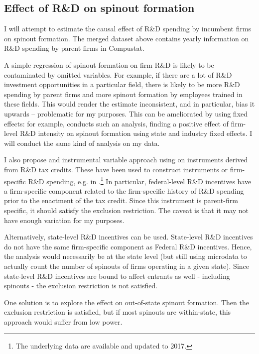 \documentclass[11pt,english]{article}
\theoremstyle{remark}
\begin{document}
\subsection{Effect of R\&D on spinout formation}

I will attempt to estimate the causal effect of R\&D spending by incumbent firms on spinout formation. The merged dataset above contains yearly information on R\&D spending by parent firms in Compustat. 

A simple regression of spinout formation on firm R\&D is likely to be contaminated by omitted variables. For example, if there are a lot of R\&D investment opportunities in a particular field, there is likely to be more R\&D spending by parent firms and more spinout formation by employees trained in these fields. This would render the estimate inconsistent, and in particular, bias it upwards -- problematic for my purposes. This can be ameliorated by using fixed effects: for example, \cite{baslandze_spinout_2019} conducts such an analysis, finding a positive effect of firm-level R\&D intensity on spinout formation using state and industry fixed effects. I will conduct the same kind of analysis on my data.

I also propose and instrumental variable approach using on instruments derived from R\&D tax credits. These have been used to construct instruments or firm-specific R\&D spending, e.g. in \cite{bloom_identifying_2013}.\footnote{The underlying data are available and updated to 2017.}  
In particular, federal-level R\&D incentives have a firm-specific component related to the firm-specific history of R\&D spending prior to the enactment of the tax credit. Since this instrument is parent-firm specific, it should satisfy the exclusion restriction. The caveat is that it may not have enough variation for my purposes.

Alternatively, state-level R\&D incentives can be used. State-level R\&D incentives do not have the same firm-specific component as Federal R\&D incentives. Hence, the analysis would necessarily be at the state level (but still using microdata to actually count the number of spinouts of firms operating in a given state). Since state-level R\&D incentives are bound to affect entrants as well - including spinouts - the exclusion restriction is not satisfied. 

One solution is to explore the effect on out-of-state spinout formation. Then the exclusion restriction is satisfied, but if most spinouts are within-state, this approach would suffer from low power. 
\end{document}
